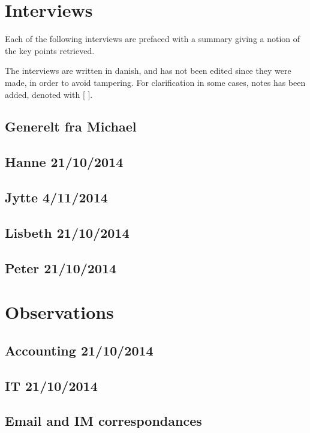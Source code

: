 \chapter{Interviews}
\label{app:interviews}
Each of the following interviews are prefaced with a summary giving a notion of the key points retrieved.

The interviews are written in danish, and has not been edited since they were made, in order to avoid tampering.
For clarification in some cases, notes has been added, denoted with [ ].

\section{Generelt fra Michael}

\section{Hanne 21/10/2014}

\section{Jytte 4/11/2014}

\section{Lisbeth 21/10/2014}

\section{Peter 21/10/2014}

\chapter{Observations}
\section{Accounting 21/10/2014}

\section{IT 21/10/2014}

\section{Email and IM correspondances}
